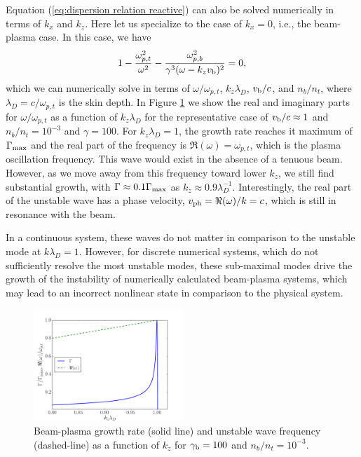 \documentclass[usenatbib,iop,apj,numberedappendix]{aeb_emulateapj_2015}
\newcommand{\gammabeam}{\ensuremath{\gamma_{\rm b}}}
\newcommand{\vbeam}{\ensuremath{v_{\rm b}}}
\begin{document}
Equation (\ref{eq:dispersion relation reactive}) can also be solved numerically in terms of $k_x$ and $k_z$.  Here let us specialize to the case of $k_x = 0$, i.e., the beam-plasma case.  In this case, we have 
\begin{equation}\label{eq:dispersion relation beam-plasma}
 1 - \frac{\omega_{p,t}^2}{\omega^2} - \frac{\omega_{p,b}^2}{\gamma^3(\omega-k_z \vbeam)^2} = 0,
\end{equation}
which we can numerically solve in terms of $\omega/\omega_{p,t}$, $k_z\lambda_D$, $\vbeam/c$, and $n_b/n_t$, where $\lambda_D = c/\omega_{p,t}$ is the skin depth.  In Figure \ref{fig:OffResonance} we show the real and imaginary parts for $\omega/\omega_{p,t}$ as a function of $k_z\lambda_D$ for the representative case of $\vbeam/c \approx 1$ and $n_b/n_t = 10^{-3}$ and $\gamma=100$.    For $k_z\lambda_D = 1$, the growth rate reaches it maximum of $\Gamma_{\rm max}$ and the real part of the frequency is $\Re(\omega) = \omega_{p,t}$, which is the plasma oscillation frequency.  This wave would exist in the absence of a tenuous beam.  However, as we move away from this frequency toward lower $k_z$, we still find substantial growth, with $\Gamma \approx 0.1 \Gamma_{\rm max}$ as $k_z \approx 0.9\lambda_D^{-1}$.  Interestingly, the real part of the unstable wave has a phase velocity, $v_{\rm ph} = \Re(\omega)/k = c$, which is still in resonance with the beam.  

In a continuous system, these waves do not matter in comparison to the unstable mode at $k\lambda_D = 1$.   However, for discrete numerical systems, which do not sufficiently resolve the most unstable modes, these sub-maximal modes drive the growth of the instability of numerically calculated beam-plasma systems, which may lead to an incorrect nonlinear state in comparison to the physical system.

\begin{figure}
\includegraphics[width=0.5\textwidth]{off_res.pdf}
\caption{Beam-plasma growth rate (solid line) and unstable wave frequency (dashed-line) as a function of
  $k_z$ for $\gammabeam = 100$ and $n_b/n_t=10^{-3}$. \label{fig:OffResonance}}
\end{figure}
\end{document}
